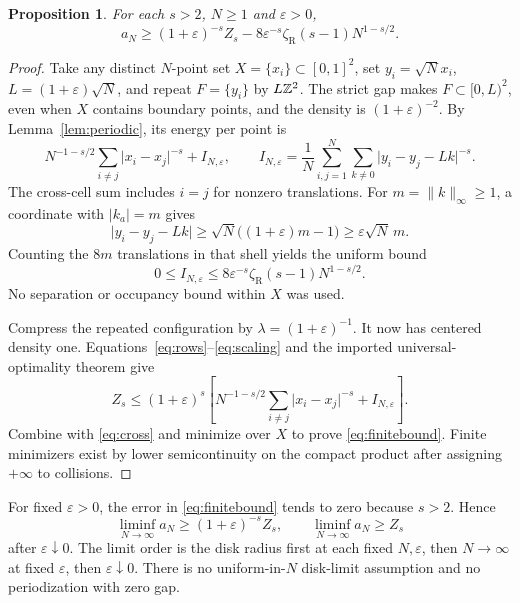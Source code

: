 \documentclass[11pt]{article}
\newtheorem{proposition}[theorem]{Proposition}
\newcommand{\abs}[1]{\lvert#1\rvert}\newcommand{\norm}[1]{\lVert#1\rVert}
\begin{document}
\begin{proposition}\label{prop:lower}
For each $s>2$, $N\ge1$ and $\varepsilon>0$,
\begin{equation}\label{eq:finitebound}
 a_N\ge(1+\varepsilon)^{-s}Z_s
       -8\varepsilon^{-s}\zeta_{\mathrm R}(s-1)N^{1-s/2}.
\end{equation}
\end{proposition}
\begin{proof}
Take any distinct $N$-point set $X=\{x_i\}\subset[0,1]^2$, set
$y_i=\sqrt N x_i$, $L=(1+\varepsilon)\sqrt N$, and repeat
$F=\{y_i\}$ by $L\mathbb Z^2$. The strict gap makes $F\subset[0,L)^2$, even
when $X$ contains boundary points, and the density is $(1+\varepsilon)^{-2}$.
By Lemma~\ref{lem:periodic}, its energy per point is
\[
 N^{-1-s/2}\sum_{i\ne j}\abs{x_i-x_j}^{-s}+I_{N,\varepsilon},\qquad
 I_{N,\varepsilon}=\frac1N\sum_{i,j=1}^N\sum_{k\ne0}
                  \abs{y_i-y_j-Lk}^{-s}.
\]
The cross-cell sum includes $i=j$ for nonzero translations.
For $m=\norm{k}_\infty\ge1$, a coordinate with $\abs{k_a}=m$ gives
\[
 \abs{y_i-y_j-Lk}\ge\sqrt N\big((1+\varepsilon)m-1\big)
                       \ge\varepsilon\sqrt N\,m.
\]
Counting the $8m$ translations in that shell yields the uniform bound
\begin{equation}\label{eq:cross}
 0\le I_{N,\varepsilon}\le
 8\varepsilon^{-s}\zeta_{\mathrm R}(s-1)N^{1-s/2}.
\end{equation}
No separation or occupancy bound within $X$ was used.

Compress the repeated configuration by $\lambda=(1+\varepsilon)^{-1}$.
It now has centered density one. Equations~\eqref{eq:rows}--\eqref{eq:scaling}
and the imported universal-optimality theorem give
\[
 Z_s\le(1+\varepsilon)^s\left[
       N^{-1-s/2}\sum_{i\ne j}\abs{x_i-x_j}^{-s}+I_{N,\varepsilon}\right].
\]
Combine with \eqref{eq:cross} and minimize over $X$ to prove
\eqref{eq:finitebound}. Finite minimizers exist by lower semicontinuity
on the compact product after assigning $+\infty$ to collisions.
\end{proof}

For fixed $\varepsilon>0$, the error in \eqref{eq:finitebound} tends to zero
because $s>2$. Hence
\[
 \liminf_{N\to\infty}a_N\ge(1+\varepsilon)^{-s}Z_s,
 \qquad \liminf_{N\to\infty}a_N\ge Z_s
\]
after $\varepsilon\downarrow0$. The limit order is the disk radius first
at each fixed $N,\varepsilon$, then $N\to\infty$ at fixed $\varepsilon$,
then $\varepsilon\downarrow0$. There is no uniform-in-$N$ disk-limit
assumption and no periodization with zero gap.
\end{document}
